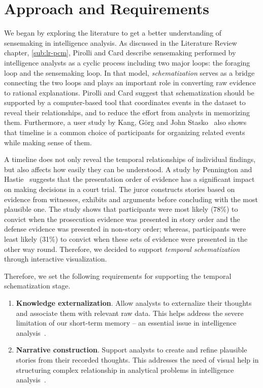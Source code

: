\section{Approach and Requirements}
We began by exploring the literature to get a better understanding of sensemaking in intelligence analysis. As discussed in the Literature Review chapter, \autoref{sub:lr-pcm}, Pirolli and Card describe sensemaking performed by intelligence analysts as a cyclic process including two major loops: the foraging loop and the sensemaking loop. In that model, \emph{schematization} serves as a bridge connecting the two loops and plays an important role in converting raw evidence to rational explanations. Pirolli and Card suggest that schematization should be supported by a computer-based tool that coordinates events in the dataset to reveal their relationships, and to reduce the effort from analysts in memorizing them. Furthermore, a user study by Kang, Görg and John Stasko~\cite{Kang2011} also shows that timeline is a common choice of participants for organizing related events while making sense of them.

A timeline does not only reveal the temporal relationships of individual findings, but also affects how easily they can be understood. A study by Pennington and Hastie~\cite{Pennington1991} suggests that the presentation order of evidence has a significant impact on making decisions in a court trial. The juror constructs stories based on evidence from witnesses, exhibits and arguments before concluding with the most plausible one. The study shows that participants were most likely (78\%) to convict when the prosecution evidence was presented in story order and the defense evidence was presented in non-story order; whereas, participants were least likely (31\%) to convict when these sets of evidence were presented in the other way round. Therefore, we decided to support \emph{temporal schematization} through interactive visualization.

Therefore, we set the following requirements for supporting the temporal schematization stage.

\begin{enumerate}
	\item \textbf{Knowledge externalization}. Allow analysts to externalize their thoughts and associate them with relevant raw data. This helps address the severe limitation of our short-term memory -- an essential issue in intelligence analysis~\cite{Heuer1999}.
	\item \textbf{Narrative construction}. Support analysts to create and refine plausible stories from their recorded thoughts. This addresses the need of visual help in structuring complex relationship in analytical problems in intelligence analysis~\cite{Heuer1999}.
\end{enumerate}

